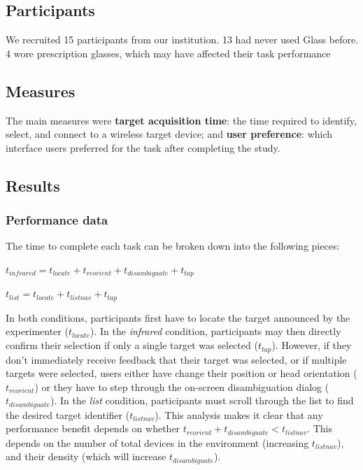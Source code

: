 \subsection{Participants}
We recruited 15 participants from our institution. 13 had never used Glass before. 4 wore prescription glasses, which may have affected their task performance 

\subsection{Measures}
The main measures were {\bf target acquisition time}: the time required to identify, select, and connect to a wireless target device; and {\bf user preference}: which interface users preferred for the task after completing the study.

\subsection{Results}
\subsubsection{Performance data}
The time to complete each task can be broken down into the following pieces:

$t_{infrared}=t_{locate}+t_{reorient}+t_{disambiguate}+t_{tap}$

$t_{list}=t_{locate}+t_{listnav}+t_{tap}$

In both conditions, participants first have to locate the target announced by the experimenter ($t_{locate}$). In the {\em infrared} condition, participants may then directly confirm their selection if only a single target was selected ($t_{tap}$). However, if they don't immediately receive feedback that their target was selected, or if multiple targets were selected, users either have change their position or head orientation ($t_{reorient}$) or they have to step through the on-screen disambiguation dialog ($t_{disambiguate}$). In the {\em list} condition, participants must scroll through the list to find the desired target identifier ($t_{listnav}$).
This analysis makes it clear that any performance benefit depends on whether $t_{reorient}+t_{disambiguate}<t_{listnav}$. This depends on the number of total devices in the environment (increasing $t_{listnav}$), and their density (which will increase $t_{disambiguate}$). 

